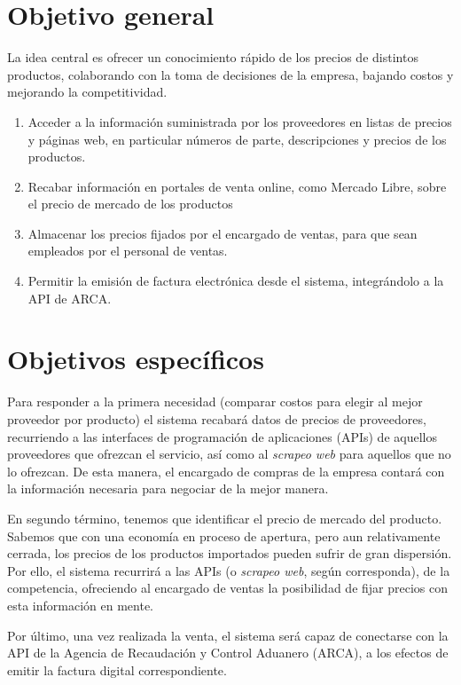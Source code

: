 \section{Objetivo general}

La idea central es ofrecer un conocimiento rápido de los precios de distintos productos,
colaborando con la toma de decisiones de la empresa, bajando costos y mejorando la competitividad.

\begin{enumerate}
	\item Acceder a la información suministrada por los proveedores en listas de precios y páginas web, 
	en particular números de parte, descripciones y precios de los productos.
	\item Recabar información en portales de venta online, como Mercado Libre, sobre el precio de mercado de los productos 
	\item Almacenar los precios fijados por el encargado de ventas, para que sean empleados por el personal de ventas.
	\item Permitir la emisión de factura electrónica desde el sistema, integrándolo a la API de ARCA.
\end{enumerate}

\section{Objetivos específicos}

Para responder a la primera necesidad
(comparar costos para elegir al mejor proveedor por producto)
el sistema recabará datos de precios de proveedores,
recurriendo a las interfaces de programación de aplicaciones (APIs)
de aquellos proveedores que ofrezcan el servicio,
así como al \textit{scrapeo web} para aquellos que no lo ofrezcan.
De esta manera,
el encargado de compras de la empresa contará con la información necesaria para negociar de la mejor manera.

En segundo término,
tenemos que identificar el precio de mercado del producto.
Sabemos que con una economía en proceso de apertura,
pero aun relativamente cerrada,
los precios de los productos importados pueden sufrir de gran dispersión.
Por ello,
el sistema recurrirá a las APIs (o \textit{scrapeo web}, según corresponda),
de la competencia,
ofreciendo al encargado de ventas la posibilidad de fijar precios con esta información en mente.

Por último,
una vez realizada la venta,
el sistema será capaz de conectarse con la API de la Agencia de Recaudación y Control Aduanero (ARCA),
a los efectos de emitir la factura digital correspondiente.
